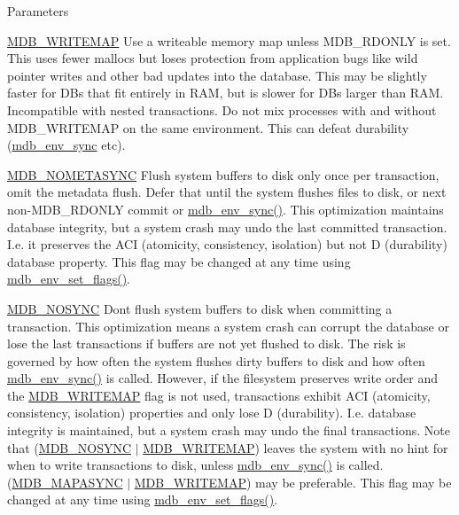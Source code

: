 \begin{DoxyParams}[1]{Parameters}
\begin{DoxyItemize}
\item \mbox{\hyperlink{group__mdb__env_ga7b81e9fd5f8fae38786d67e1a8387fa7}{M\+D\+B\+\_\+\+W\+R\+I\+T\+E\+M\+AP}} Use a writeable memory map unless M\+D\+B\+\_\+\+R\+D\+O\+N\+LY is set. This uses fewer mallocs but loses protection from application bugs like wild pointer writes and other bad updates into the database. This may be slightly faster for D\+Bs that fit entirely in R\+AM, but is slower for D\+Bs larger than R\+AM. Incompatible with nested transactions. Do not mix processes with and without M\+D\+B\+\_\+\+W\+R\+I\+T\+E\+M\+AP on the same environment. This can defeat durability (\mbox{\hyperlink{group__mdb_ga85e61f05aa68b520cc6c3b981dba5037}{mdb\+\_\+env\+\_\+sync}} etc). 
\item \mbox{\hyperlink{group__mdb__env_ga5021c4e96ffe9f383f5b8ab2af8e4b16}{M\+D\+B\+\_\+\+N\+O\+M\+E\+T\+A\+S\+Y\+NC}} Flush system buffers to disk only once per transaction, omit the metadata flush. Defer that until the system flushes files to disk, or next non-\/\+M\+D\+B\+\_\+\+R\+D\+O\+N\+LY commit or \mbox{\hyperlink{group__mdb_ga85e61f05aa68b520cc6c3b981dba5037}{mdb\+\_\+env\+\_\+sync()}}. This optimization maintains database integrity, but a system crash may undo the last committed transaction. I.\+e. it preserves the A\+CI (atomicity, consistency, isolation) but not D (durability) database property. This flag may be changed at any time using \mbox{\hyperlink{group__mdb_ga83f66cf02bfd42119451e9468dc58445}{mdb\+\_\+env\+\_\+set\+\_\+flags()}}. 
\item \mbox{\hyperlink{group__mdb__env_ga5791dd1adb09123f82dd1f331209e12e}{M\+D\+B\+\_\+\+N\+O\+S\+Y\+NC}} Don\textquotesingle{}t flush system buffers to disk when committing a transaction. This optimization means a system crash can corrupt the database or lose the last transactions if buffers are not yet flushed to disk. The risk is governed by how often the system flushes dirty buffers to disk and how often \mbox{\hyperlink{group__mdb_ga85e61f05aa68b520cc6c3b981dba5037}{mdb\+\_\+env\+\_\+sync()}} is called. However, if the filesystem preserves write order and the \mbox{\hyperlink{group__mdb__env_ga7b81e9fd5f8fae38786d67e1a8387fa7}{M\+D\+B\+\_\+\+W\+R\+I\+T\+E\+M\+AP}} flag is not used, transactions exhibit A\+CI (atomicity, consistency, isolation) properties and only lose D (durability). I.\+e. database integrity is maintained, but a system crash may undo the final transactions. Note that (\mbox{\hyperlink{group__mdb__env_ga5791dd1adb09123f82dd1f331209e12e}{M\+D\+B\+\_\+\+N\+O\+S\+Y\+NC}} $\vert$ \mbox{\hyperlink{group__mdb__env_ga7b81e9fd5f8fae38786d67e1a8387fa7}{M\+D\+B\+\_\+\+W\+R\+I\+T\+E\+M\+AP}}) leaves the system with no hint for when to write transactions to disk, unless \mbox{\hyperlink{group__mdb_ga85e61f05aa68b520cc6c3b981dba5037}{mdb\+\_\+env\+\_\+sync()}} is called. (\mbox{\hyperlink{group__mdb__env_gab034ed0d8e5938090aef5ee0997f7e94}{M\+D\+B\+\_\+\+M\+A\+P\+A\+S\+Y\+NC}} $\vert$ \mbox{\hyperlink{group__mdb__env_ga7b81e9fd5f8fae38786d67e1a8387fa7}{M\+D\+B\+\_\+\+W\+R\+I\+T\+E\+M\+AP}}) may be preferable. This flag may be changed at any time using \mbox{\hyperlink{group__mdb_ga83f66cf02bfd42119451e9468dc58445}{mdb\+\_\+env\+\_\+set\+\_\+flags()}}. 

\end{DoxyItemize}
\end{DoxyParams}
